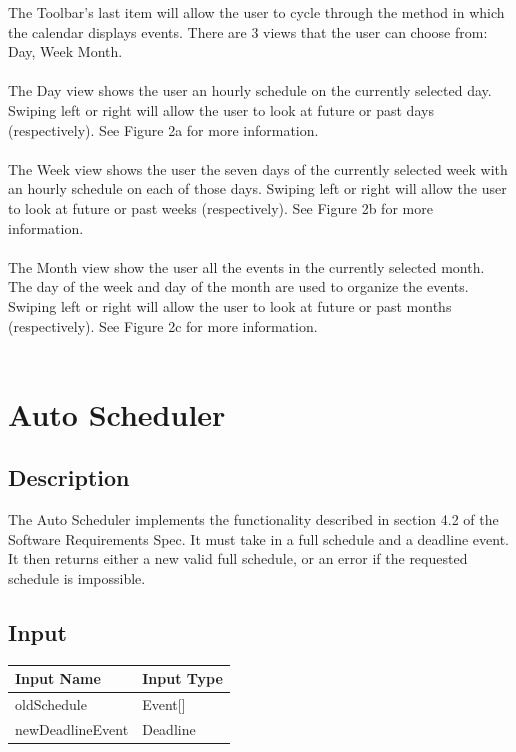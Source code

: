 \documentclass{scrreprt}
\begin{document}
The Toolbar's last item will allow the user to cycle through the method in which the calendar displays events.  There are 3 views that the user can choose from: Day, Week Month. \\
\\
The Day view shows the user an hourly schedule on the currently selected day.  Swiping left or right will allow the user to look at future or past days (respectively). See Figure 2a for more information. \\
\\
The Week view shows the user the seven days of the currently selected week with an hourly schedule on each of those days.  Swiping left or right will allow the user to look at future or past weeks (respectively). See Figure 2b for more information. \\
\\
The Month view show the user all the events in the currently selected month.  The day of the week and day of the month are used to organize the events.  Swiping left or right will allow the user to look at future or past months (respectively).  See Figure 2c for more information. \\
\\

\chapter{Auto Scheduler}

\section{Description}
The Auto Scheduler implements the functionality described in section 4.2 of the Software Requirements Spec.  It must take in a full schedule and a deadline event.  It then returns either a new valid full schedule, or an error if the requested schedule is impossible.

\section{Input}
\begin{center}
\begin{longtable}{ | p{5cm} | p{9cm} | }
\hline
\textbf{Input Name} & \textbf{Input Type}\\
\hline
oldSchedule & Event[] \\
\hline
newDeadlineEvent & Deadline \\
\hline
\end{longtable}
\end{center}
\end{document}
